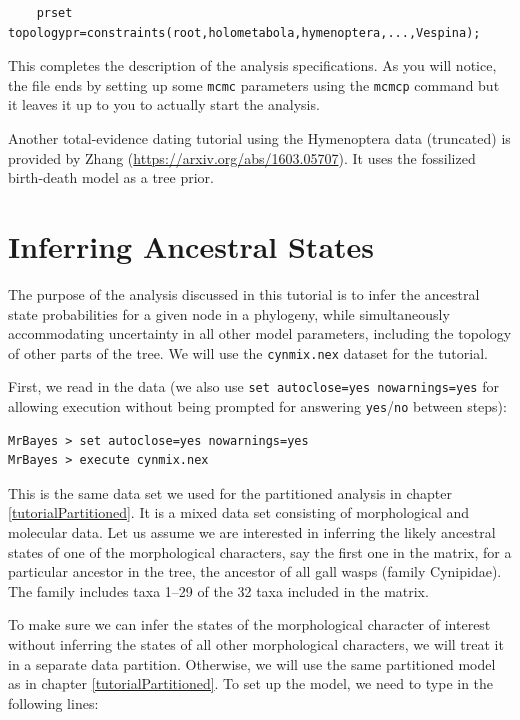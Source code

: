 \documentclass[12pt]{book}
\newcommand{\ttt}[1]{\texttt{#1}}
\begin{document}
\small
\begin{verbatim}
    prset topologypr=constraints(root,holometabola,hymenoptera,...,Vespina);
\end{verbatim}
\normalsize

This completes the description of the analysis specifications. As you will notice, the file ends by
setting up some \ttt{mcmc} parameters using the \ttt{mcmcp} command but it leaves it up to you to
actually start the analysis.

Another total-evidence dating tutorial using the Hymenoptera data (truncated) is provided by Zhang (\url{https://arxiv.org/abs/1603.05707}). It uses the fossilized birth-death model \citep{Stadler:2010fn,Heath:2014hn,Zhang:2016kf} as a tree prior.

\section{Inferring Ancestral States}

The purpose of the analysis discussed in this tutorial is to infer the ancestral state
probabilities for a given node in a phylogeny, while simultaneously accommodating uncertainty in
all other model parameters, including the topology of other parts of the tree. We will use the
\ttt{cynmix.nex} dataset for the tutorial.

First, we read in the data (we also use \ttt{set autoclose=yes nowarnings=yes} for allowing
execution without being prompted for answering \ttt{yes}/\ttt{no} between steps):

\small
\begin{singlespacing}
\begin{verbatim}
MrBayes > set autoclose=yes nowarnings=yes
MrBayes > execute cynmix.nex
\end{verbatim}
\end{singlespacing}
\normalsize

This is the same data set we used for the partitioned analysis in chapter
\ref{tutorialPartitioned}. It is a mixed data set consisting of morphological and molecular data.
Let us assume we are interested in inferring the likely ancestral states of one of the
morphological characters, say the first one in the matrix, for a particular ancestor in the tree,
the ancestor of all gall wasps (family Cynipidae). The family includes taxa 1--29 of the 32 taxa
included in the matrix.

To make sure we can infer the states of the morphological character of interest without inferring
the states of all other morphological characters, we will treat it in a separate data partition.
Otherwise, we will use the same partitioned model as in chapter \ref{tutorialPartitioned}. To set
up the model, we need to type in the following lines:
\end{document}
